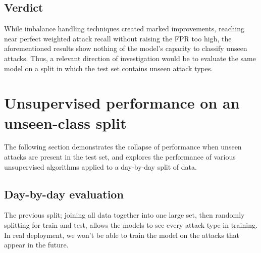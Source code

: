 \documentclass{article}
\begin{document}
\begin{table}[]
\centering
{}
\caption{Per-frequency-band unweighted recall comparison of baseline and with synthesis of imbalance handling techniques applied.}
\end{table}
\subsection{Verdict}  
While imbalance handling techniques created marked improvements, reaching near perfect weighted attack recall without raising the FPR too high, the aforementioned results show nothing of the model's capacity to classify unseen attacks. Thus, a relevant direction of investigation would be to evaluate the same model on a split in which the test set contains unseen attack types.
\section{Unsupervised performance on an unseen-class split}
The following section demonstrates the collapse of performance when unseen attacks are present in the test set, and explores the performance of various unsupervised algorithms applied to a day-by-day split of data. 
\subsection{Day-by-day evaluation}
The previous split; joining all data together into one large set, then randomly splitting for train and test, allows the models to see every attack type in training. In real deployment, we won't be able to train the model on the attacks that appear in the future. 
\end{document}
